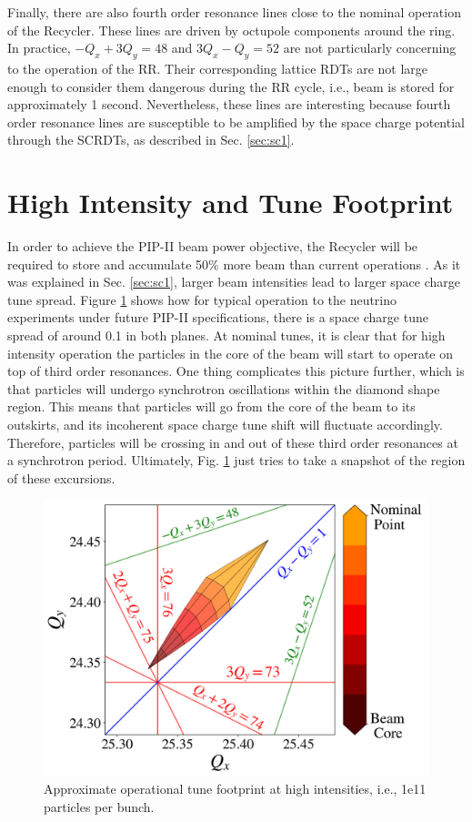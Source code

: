 Finally, there are also fourth order resonance lines close to the nominal operation of the Recycler. These lines are driven by octupole components around the ring. In practice, $-Q_x+3Q_y = 48$ and $3Q_x-Q_y = 52$ are not particularly concerning to the operation of the RR. Their corresponding lattice RDTs are not large enough to consider them dangerous during the RR cycle, i.e., beam is stored for approximately 1 second. Nevertheless, these lines are interesting because fourth order resonance lines are susceptible to be amplified by the space charge potential through the SCRDTs, as described in Sec. \ref{sec:sc1}.    

\section{High Intensity and Tune Footprint}

In order to achieve the PIP-II beam power objective, the Recycler will be required to store and accumulate 50\% more beam than current operations \cite{pipII1}. As it was explained in Sec. \ref{sec:sc1}, larger beam intensities lead to larger space charge tune spread. Figure \ref{fig:rrtdhigh} shows how for typical operation to the neutrino experiments under future PIP-II specifications, there is a space charge tune spread of around 0.1 in both planes. At nominal tunes, it is clear that for high intensity operation the particles in the core of the beam will start to operate on top of third order resonances. One thing complicates this picture further, which is that particles will undergo synchrotron oscillations within the diamond shape region. This means that particles will go from the core of the beam to its outskirts, and its incoherent space charge tune shift will fluctuate accordingly. Therefore, particles will be crossing in and out of these third order resonances at a synchrotron period. Ultimately, Fig. \ref{fig:rrtdhigh} just tries to take a snapshot of the region of these excursions.  

\begin{figure}[H]
   \centering
   \includegraphics[width=\columnwidth]{chapter3/rrtdhigh.png}
   \caption{Approximate operational tune footprint at high intensities, i.e., 1e11 particles per bunch.}
   \label{fig:rrtdhigh}
\end{figure}

